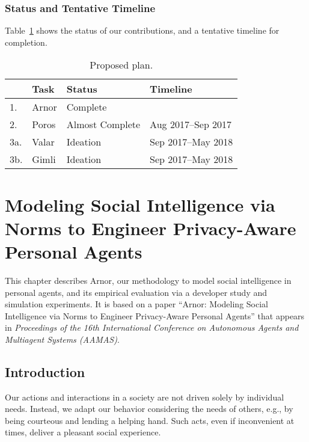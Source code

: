 \documentclass[11pt,          %
               phd,           %
               onehalfspacing %
               ]{ncsuthesis}
\newcommand{\frameworkA}{Arnor\xspace}
\newcommand{\frameworkB}{Poros\xspace}
\newcommand{\frameworkC}{Valar\xspace}
\newcommand{\frameworkD}{Gimli\xspace}
\begin{document}
%
\subsection{Status and Tentative Timeline}
\label{sec:intro-plan}
%

Table~\ref{tab:proposed-plan} shows the status of our contributions, and 
a tentative timeline for completion.

\begin{table}[!htb]
\centering
\caption{Proposed plan.}
\begin{tabular}{@{}p{2cm}p{4cm}p{4cm}p{5cm}@{}}
\toprule
& Task&Status&Timeline\\
\midrule
1. & \frameworkA & Complete & \\
2. & \frameworkB & Almost Complete & Aug 2017--Sep 2017\\
3a.& \frameworkC & Ideation & Sep 2017--May 2018 \\
3b.& \frameworkD & Ideation & Sep 2017--May 2018\\

\bottomrule
\end{tabular}
\label{tab:proposed-plan}
\end{table}



\chapter[Modeling Social Intelligence via Norms]{Modeling Social Intelligence via Norms to Engineer Privacy-Aware Personal Agents}
\label{chap:arnor}

This chapter describes \frameworkA, our methodology to model social
intelligence in personal agents, and its empirical evaluation via a
developer study and simulation experiments. It is based on a
paper ``Arnor: Modeling Social Intelligence via Norms to Engineer
Privacy-Aware Personal Agents'' that appears in \emph{Proceedings of the
16th International Conference on Autonomous Agents and Multiagent
Systems (AAMAS)}.

\section{Introduction}
\label{sec:arnor-intro}

Our actions and interactions in a society are not driven solely by
individual needs. Instead, we adapt our behavior considering the needs
of others, e.g., by being courteous and lending a helping hand. Such
acts, even if inconvenient at times, deliver a pleasant social
experience.
\end{document}
